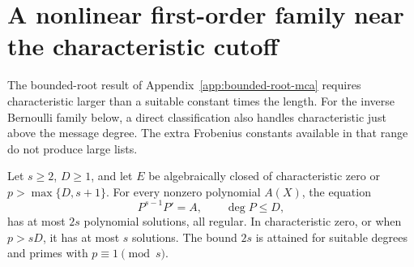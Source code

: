 \section{A nonlinear first-order family near the characteristic cutoff}
\label{app:inverse-bernoulli}

The bounded-root result of Appendix~\ref{app:bounded-root-mca} requires
characteristic larger than a suitable constant times the length.
For the inverse Bernoulli family below, a direct classification also
handles characteristic just above the message degree. The extra
Frobenius constants available in that range do not produce large lists.

\begin{theorem}
\label{thm:inverse-bernoulli}
Let $s\ge2$, $D\ge1$, and let $E$ be algebraically closed of
characteristic zero or $p>\max\{D,s+1\}$. For every nonzero polynomial
$A(X)$, the equation
\[
 P^{s-1}P'=A,\qquad \deg P\le D,
\]
has at most $2s$ polynomial solutions, all regular. In characteristic
zero, or when $p>sD$, it has at most $s$ solutions. The bound $2s$
is attained for suitable degrees and primes with $p\equiv1\pmod s$.
\end{theorem}

